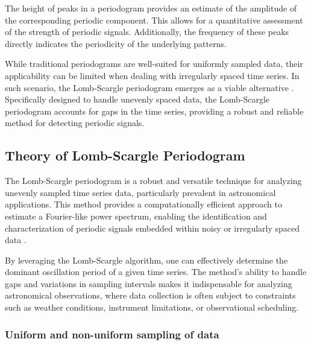     		The height of peaks in a periodogram provides an estimate of the amplitude of the corresponding periodic component. This allows for a quantitative assessment of the strength of periodic signals. Additionally, the frequency of these peaks directly indicates the periodicity of the underlying patterns.
    		
    		While traditional periodograms are well-suited for uniformly sampled data, their applicability can be limited when dealing with irregularly spaced time series. In such scenario, the Lomb-Scargle periodogram emerges as a viable alternative \cite{lomb1976least,scargle1982studies}. Specifically designed to handle unevenly spaced data, the Lomb-Scargle periodogram accounts for gaps in the time series, providing a robust and reliable method for detecting periodic signals.
    		
    	\subsection{Theory of Lomb-Scargle Periodogram}
    		The Lomb-Scargle periodogram is a robust and versatile technique for analyzing unevenly sampled time series data, particularly prevalent in astronomical applications. This method provides a computationally efficient approach to estimate a Fourier-like power spectrum, enabling the identification and characterization of periodic signals embedded within noisy or irregularly spaced data \cite{vanderplas2018understanding}.
    		
    		By leveraging the Lomb-Scargle algorithm, one can effectively determine the dominant oscillation period of a given time series. The method's ability to handle gaps and variations in sampling intervals makes it indispensable for analyzing astronomical observations, where data collection is often subject to constraints such as weather conditions, instrument limitations, or observational scheduling.
    	
    		\subsubsection{Uniform and non-uniform sampling of data}
